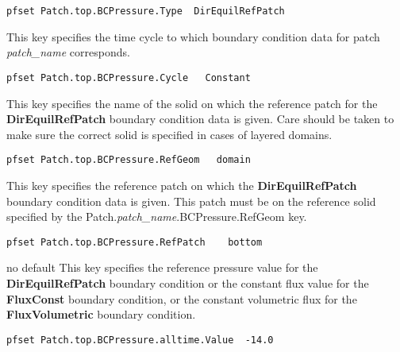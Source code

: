 \begin{display}\begin{verbatim}
pfset Patch.top.BCPressure.Type  DirEquilRefPatch
\end{verbatim}\end{display}

{This key specifies the time cycle to which boundary condition data for patch
{\em patch\_name} corresponds.
}
\begin{display}\begin{verbatim}
pfset Patch.top.BCPressure.Cycle   Constant
\end{verbatim}\end{display}

{This key specifies the name of the solid on which the reference patch for the
{\bf DirEquilRefPatch} boundary condition data is given.
Care should be taken to
make sure the correct solid is specified in cases of layered domains.
}
\begin{display}\begin{verbatim}
pfset Patch.top.BCPressure.RefGeom   domain
\end{verbatim}\end{display}

{This key specifies the reference patch on which the
{\bf DirEquilRefPatch} boundary condition data is given.  This patch must be on
the reference solid specified by the Patch.{\em patch\_name}.BCPressure.RefGeom
key.
}
\begin{display}\begin{verbatim}
pfset Patch.top.BCPressure.RefPatch    bottom
\end{verbatim}\end{display}

{no default}
{This key specifies the reference pressure value for the
{\bf DirEquilRefPatch} boundary condition or the constant flux value for the
{\bf FluxConst} boundary condition, or the constant volumetric flux for the
{\bf FluxVolumetric} boundary condition.
}
\begin{display}\begin{verbatim}
pfset Patch.top.BCPressure.alltime.Value  -14.0
\end{verbatim}\end{display}

